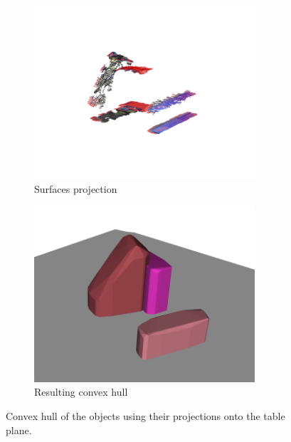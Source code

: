 \begin{figure}[h]
\centering
\begin{subfigure}[t]{0.45\textwidth}
\centering
\includegraphics[width=0.9\textwidth]{Img/convexhull/projection.png}
\caption{Surfaces projection}\label{fig:projection}
\end{subfigure}
\begin{subfigure}[t]{0.45\textwidth}
\centering
\includegraphics[width=0.9\textwidth]{Img/convexhull/full_convexhull2.png}
\caption{Resulting convex hull}\label{fig:full_convexhull_}
\end{subfigure}
\caption{Convex hull of the objects using their projections onto the table plane.}\label{fig:full_convexhull}
\end{figure}


